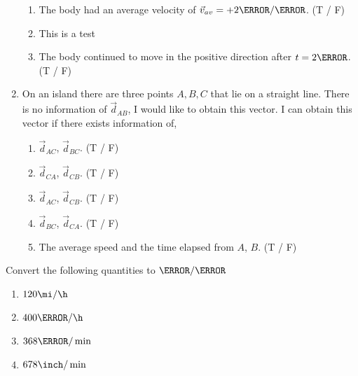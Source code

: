 \documentclass[12pt]{article} %
\begin{document}
\begin{qstn}[1]
\begin{enumerate}
\begin{figure}[h]
\end{figure}
	\begin{enumerate}[label = (\alph*)]
		\item The body had an average velocity of $\vec v_{av} = +2 \m / \s$. (T / F)
		\item This is a test 
		\item The body continued to move in the positive direction after $t = 2\s$. (T / F)
	\end{enumerate}

\item On an island there are three points $A,B,C$ that lie on a straight line. There is no information of $\vec d_{AB}$, I would like to obtain this vector. I can obtain this vector if there exists information of,
	\begin{enumerate}[label = (\alph*)]
		\item $\vec d_{AC}$, $\vec d_{BC}$. (T / F)
		\item $\vec d_{CA}$, $\vec d_{CB}$. (T / F)
		\item $\vec d_{AC}$, $\vec d_{CB}$. (T / F)
		\item $\vec d_{BC}$, $\vec d_{CA}$. (T / F)
		\item The average speed and the time elapsed from $A$, $B$. (T / F) 
	\end{enumerate}
 


\end{enumerate}


\end{qstn}



\begin{qstn}[2] %
	Convert the following quantities to $\m / \s$
	\begin{enumerate}[label = (\alph*)]
		\item $120 \mi / \h$
		\vspace*{4cm}

		\item $400 \km / \h$
		\vspace*{4cm}
		
		\item $368 \m / \min$
		\vspace*{4cm}

		\item $678 \inch / \min$
		\vspace*{4cm}

	\end{enumerate}

\end{qstn}
\end{document}
